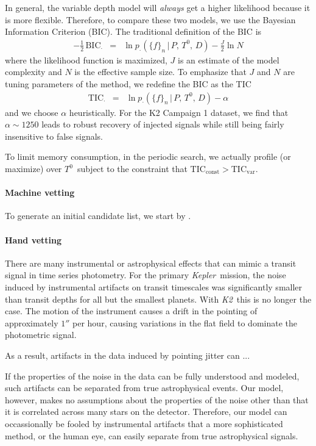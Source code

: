 \documentclass[12pt,preprint]{aastex}
\newcommand{\project}[1]{\textsl{#1}} %
\newcommand{\kepler}{\project{Kepler}}
\newcommand{\KT}{\project{K2}}
\newcommand{\BIC}{{\ensuremath{\mathrm{BIC}}}}
\newcommand{\TIC}{{\ensuremath{\mathrm{TIC}}}}
\newcommand{\flux}{{\ensuremath{f}}}
\newcommand{\period}{{\ensuremath{P}}}
\newcommand{\phase}{{\ensuremath{T^0}}}
\newcommand{\duration}{{\ensuremath{D}}}
\begin{document}
In general, the variable depth model will \emph{always} get a higher
likelihood because it is more flexible.
Therefore, to compare these two models, we use the Bayesian Information
Criterion (BIC).
The traditional definition of the BIC is
\begin{eqnarray}
-\frac{1}{2}\,\BIC_\cdot &=&
    \ln p_\cdot(\{\flux\}_n\,|\,\period,\,\phase,\,\duration)
    - \frac{J}{2} \ln N
\end{eqnarray}
where the likelihood function is maximized, $J$ is an estimate of the model
complexity and $N$ is the effective sample size.
To emphasize that $J$ and $N$ are tuning parameters of the method, we
redefine the BIC as the TIC
\begin{eqnarray}
\TIC_\cdot &=&
    \ln p_\cdot(\{\flux\}_n\,|\,\period,\,\phase,\,\duration) - \alpha
\end{eqnarray}
and we choose $\alpha$ heuristically.
For the K2 Campaign 1 dataset, we find that $\alpha \sim 1250$ leads to robust
recovery of injected signals while still being fairly insensitive to false
signals.

To limit memory consumption, in the periodic search, we actually profile (or
maximize) over \phase\ subject to the constraint that $\TIC_\mathrm{const} >
\TIC_\mathrm{var}$.


\paragraph{Machine vetting}

To generate an initial candidate list, we start by .

\paragraph{Hand vetting}

There are many instrumental or astrophysical effects that can mimic a transit
signal in time series photometry.
For the primary \kepler\ mission, the noise induced by instrumental artifacts
on transit timescales was significantly smaller than transit depths for 
all but the smallest planets.
With \KT\ this is no longer the case.
The motion of the instrument causes a drift in the pointing of approximately
$1''$ per hour, causing variations in the flat field to dominate the 
photometric signal.

As a result, artifacts in the data induced by pointing jitter can ...

If the properties of the noise in the data can be fully understood and 
modeled, such artifacts can be separated from true astrophysical events.
Our model, however, makes no assumptions about the properties of the noise
other than that it is correlated across many stars on the detector.
Therefore, our model can occassionally be fooled by instrumental artifacts
that a more sophisticated method, or the human eye, can easily separate 
from true astrophysical signals.
\end{document}
